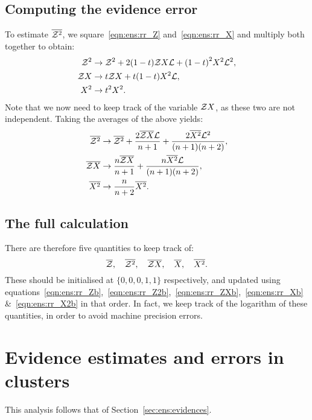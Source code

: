 \subsection{Computing the evidence error}
\label{sec:ens:basic_error}
To estimate \(\overline{\mathcal{Z}^2}\), we square~\eqref{eqn:ens:rr_Z} and~\eqref{eqn:ens:rr_X} and multiply both together to obtain:
%
\begin{align}
  \mathcal{Z}^2 &\to \mathcal{Z}^2 + 2(1-t)\mathcal{Z} X\mathcal{L} +  {(1-t)}^2X^2\mathcal{L} ^2,
  \label{eqn:ens:rr_Z2b}
  \\
  \mathcal{Z} X &\to t\mathcal{Z} X + t(1-t)X^2\mathcal{L},
  \label{eqn:ens:rr_ZXb}
  \\
  X^2 &\to t^2X^2.
  \label{eqn:ens:rr_X2b}
\end{align}
%
Note that we now need to keep track of the variable \(\mathcal{Z} X\), as these two are not independent.
Taking the averages of the above yields:
\begin{align}
  \overline{\mathcal{Z}^2} &\to \overline{\mathcal{Z}^2} + \frac{2\overline{\mathcal{Z} X}\mathcal{L}}{n+1} +  \frac{2\overline{X^2}\mathcal{L}^2}{(n+1)(n+2)},
  \\
  \overline{\mathcal{Z} X} &\to \frac{n\overline{\mathcal{Z} X}}{n+1} + \frac{n\overline{X^2}\mathcal{L}}{(n+1)(n+2)},
  \\
  \overline{X^2} &\to \frac{n}{n+2}\overline{X^2}.
\end{align}

\subsection{The full calculation}
\label{sec:ens:basic_full}

There are therefore five quantities to keep track of: 
\[ \overline{\mathcal{Z}},\quad\overline{\mathcal{Z}^2},\quad\overline{\mathcal{Z} X},\quad \overline{X},\quad\overline{X^2}.\]
These should be initialised at \(\{0,0,0,1,1\}\) respectively, and updated using equations~\eqref{eqn:ens:rr_Zb},~\eqref{eqn:ens:rr_Z2b},~\eqref{eqn:ens:rr_ZXb},~\eqref{eqn:ens:rr_Xb} \&~\eqref{eqn:ens:rr_X2b} in that order. In fact, we keep track of the logarithm of these quantities, in order to avoid machine precision errors.





\section{Evidence estimates and errors in clusters}
\label{sec:ens:evidences_clusters}
This analysis follows that of Section~\ref{sec:ens:evidences}.

